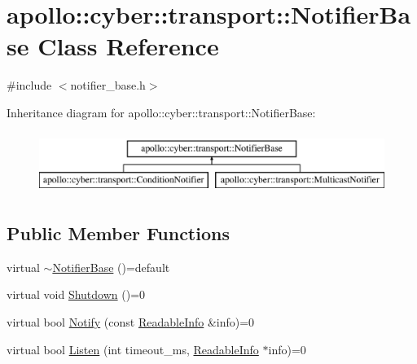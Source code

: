 \hypertarget{classapollo_1_1cyber_1_1transport_1_1NotifierBase}{\section{apollo\-:\-:cyber\-:\-:transport\-:\-:Notifier\-Base Class Reference}
\label{classapollo_1_1cyber_1_1transport_1_1NotifierBase}
}


{\ttfamily \#include $<$notifier\-\_\-base.\-h$>$}

Inheritance diagram for apollo\-:\-:cyber\-:\-:transport\-:\-:Notifier\-Base\-:\begin{figure}[H]
\begin{center}
\leavevmode
\includegraphics[height=2.000000cm]{classapollo_1_1cyber_1_1transport_1_1NotifierBase}
\end{center}
\end{figure}
\subsection*{Public Member Functions}
\begin{DoxyCompactItemize}
\item 
virtual \hyperlink{classapollo_1_1cyber_1_1transport_1_1NotifierBase_ab1f83a69f899c80831045278da0a11ba}{$\sim$\-Notifier\-Base} ()=default
\item 
virtual void \hyperlink{classapollo_1_1cyber_1_1transport_1_1NotifierBase_a48e05bdc97d573893234846fcbd9be46}{Shutdown} ()=0
\item 
virtual bool \hyperlink{classapollo_1_1cyber_1_1transport_1_1NotifierBase_aef2741bc38fa6b7aca8c1cfb012975dd}{Notify} (const \hyperlink{classapollo_1_1cyber_1_1transport_1_1ReadableInfo}{Readable\-Info} \&info)=0
\item 
virtual bool \hyperlink{classapollo_1_1cyber_1_1transport_1_1NotifierBase_aa42f5b65d60d3b61a919f09b7605775b}{Listen} (int timeout\-\_\-ms, \hyperlink{classapollo_1_1cyber_1_1transport_1_1ReadableInfo}{Readable\-Info} $\ast$info)=0
\end{DoxyCompactItemize}


